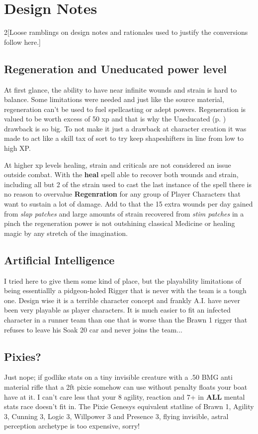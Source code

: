 \documentclass{book}
\begin{document}
\section{Design Notes}
\begin{multicols}{2}[Loose ramblings on design notes and rationales used to justify the conversions follow here.]
\subsection{Regeneration and Uneducated power level}
At first glance, the ability to have near infinite wounds and strain is hard to balance. Some limitations were needed and just like the source material, regeneration can't be used to fuel spellcasting or adept powers. Regeneration is valued to be worth excess of 50 xp and that is why the Uneducated (p. \pageref{uneducated}) drawback is so big. To not make it just a drawback at character creation it was made to act like a skill tax of sort to try keep shapeshifters in line from low to high XP.

At higher xp levels healing, strain and criticals are not considered an issue outside combat. With the \textbf{heal} spell able to recover both wounds and strain, including all but 2 of the strain used to cast the last instance of the spell there is no reason to overvalue \textbf{Regenration} for any group of Player Characters that want to sustain a lot of damage. Add to that the 15 extra wounds per day gained from \textit{slap patches} and large amounts of strain recovered from \textit{stim patches} in a pinch the regeneration power is not outshining classical Medicine or healing magic by any stretch of the imagination.

\subsection{Artificial Intelligence}
I tried  here to give them some kind of place, but the playability limitations of being essentiallly a pidgeon-holed Rigger that is never with the team is a tough one. Design wise it is a terrible character concept and frankly A.I. have never been very playable as player characters. It is much easier to fit an infected character in a runner team than one that is worse than the Brawn 1 rigger that refuses to leave his Soak 20 car and never joins the team...

\subsection{Pixies?}
Just nope; if godlike stats on a tiny invisible creature with a .50 BMG anti material rifle that a 2ft pixie somehow can use without penalty floats your boat have at it. I can't care less that your 8 agility, reaction and 7+ in \textbf{ALL} mental stats race doesn't fit in. The Pixie Genesys equivalent statline of Brawn 1, Agility 3, Cunning 3, Logic 3, Willpower 3 and Presence 3, flying invisible, astral perception archetype is too expensive, sorry!


\end{multicols}
\end{document}
